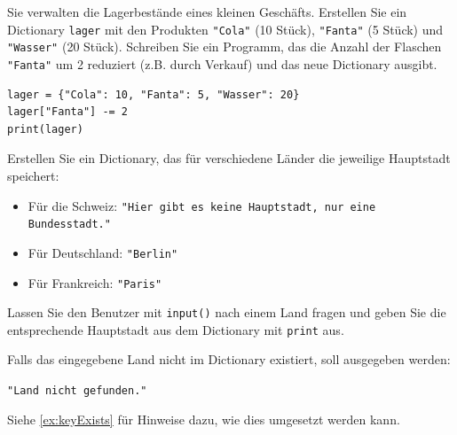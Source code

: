\begin{myexercise}
	Sie verwalten die Lagerbestände eines kleinen Geschäfts. Erstellen Sie ein Dictionary \lstinline|lager| mit den Produkten \lstinline|"Cola"| (10 Stück), \lstinline|"Fanta"| (5 Stück) und \lstinline|"Wasser"| (20 Stück). Schreiben Sie ein Programm, das die Anzahl der Flaschen \lstinline|"Fanta"| um 2 reduziert (z.B. durch Verkauf) und das neue Dictionary ausgibt.

	\begin{myanswer}
		\begin{lstlisting}
lager = {"Cola": 10, "Fanta": 5, "Wasser": 20}
lager["Fanta"] -= 2
print(lager)
\end{lstlisting}
	\end{myanswer}
\end{myexercise}

\begin{myexercise}
	Erstellen Sie ein Dictionary, das für verschiedene Länder die jeweilige Hauptstadt speichert:
	\begin{itemize}
		\item Für die Schweiz: \lstinline|"Hier gibt es keine Hauptstadt, nur eine Bundesstadt."|
		\item Für Deutschland: \lstinline|"Berlin"|
		\item Für Frankreich: \lstinline|"Paris"|
	\end{itemize}

	Lassen Sie den Benutzer mit \lstinline|input()| nach einem Land fragen und geben Sie die entsprechende Hauptstadt aus dem Dictionary mit \lstinline|print| aus.

	Falls das eingegebene Land nicht im Dictionary existiert, soll ausgegeben werden:

	\lstinline|"Land nicht gefunden."|

	Siehe \cref{ex:keyExists} für Hinweise dazu, wie dies umgesetzt werden kann.

	\begin{myanswer}
		
	\end{myanswer}
\end{myexercise}

